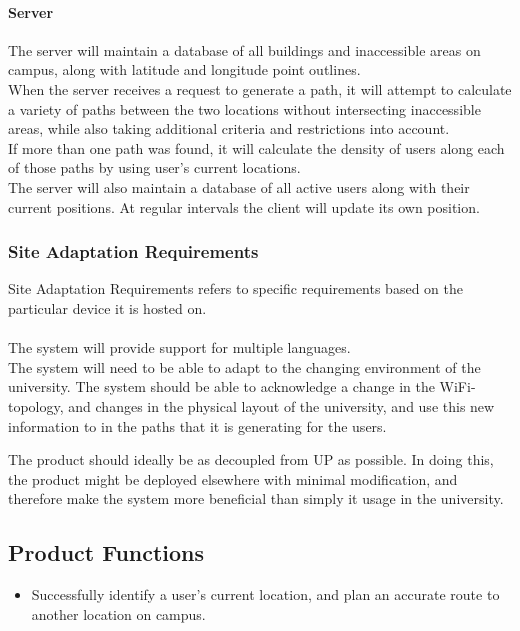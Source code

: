 \documentclass[12pt,a4paper]{article}
\begin{document}
				\paragraph{Server}
				
					The server will maintain a database of all buildings and inaccessible areas on 
					campus, along with latitude and longitude point outlines. \\
					When the server receives a request to generate a path, it will attempt to calculate 
					a variety of paths between the two locations without intersecting inaccessible areas, 
					while also taking additional criteria and restrictions into account.\\
					If more than one path was found, it will calculate the density of users along each 
					of those paths by using user's current locations.\\
					The server will also maintain a database of all active users along with their current 
					positions. At regular intervals the client will update its own position.


			\subsubsection{Site Adaptation Requirements}
			
				Site Adaptation Requirements refers to specific requirements based on the particular 
				device it is hosted on.\\\\
				The system will provide support for multiple languages.\\

				The system will need to be able to adapt to the changing environment of
				the university. The system should be able to acknowledge a change in the
				WiFi-topology, and changes in the physical layout of the university, and
				use this new information to in the paths that it is generating for the
				users.


				The product should ideally be as decoupled from UP as possible. In doing
				this, the product might be deployed elsewhere with minimal modification,
				and therefore make the system more beneficial than simply it usage in
				the university.


		\subsection{Product Functions}

			\begin{itemize}
				\item Successfully identify a user's current location, and plan an
							accurate route to another location on campus.
			\end{itemize}
\end{document}
